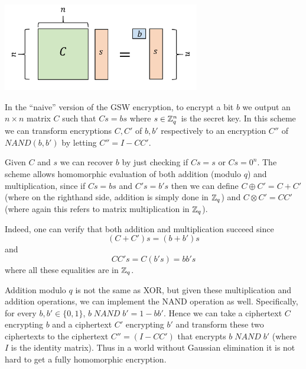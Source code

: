 \begin{marginfigure}
\centering
\includegraphics[width=\linewidth, height=1.5in, keepaspectratio]{../figure/naivegsw.png}
\caption{In the ``naive'' version of the GSW encryption, to encrypt a
bit \(b\) we output an \(n\times n\) matrix \(C\) such that \(Cs=bs\)
where \(s \in {\mathbb{Z}}_q^n\) is the secret key. In this scheme we can
transform encryptions \(C,C'\) of \(b,b'\) respectively to an encryption
\(C''\) of \(\ensuremath{\mathit{NAND}}(b,b')\) by letting
\(C'' = I-CC'\).}
\label{naivegswfig}
\end{marginfigure}

Given \(C\) and \(s\) we can recover \(b\) by just checking if \(Cs=s\)
or \(Cs=0^n\). The scheme allows homomorphic evaluation of both addition
(modulo \(q\)) and multiplication, since if \(Cs = bs\) and \(C's=b's\)
then we can define \(C \oplus C' = C + C'\) (where on the righthand
side, addition is simply done in \({\mathbb{Z}}_q\)) and
\(C\otimes C' = \ensuremath{\mathit{CC}}'\) (where again this refers to
matrix multiplication in \({\mathbb{Z}}_q\)).

Indeed, one can verify that both addition and multiplication succeed
since \[(C+C')s = (b+b')s\] and
\[\ensuremath{\mathit{CC}}'s = C(b's) = bb's\] where all these
equalities are in \({\mathbb{Z}}_q\).

Addition modulo \(q\) is not the same as XOR, but given these
multiplication and addition operations, we can implement the NAND
operation as well. Specifically, for every \(b,b' \in \{0,1\}\),
\(b \; \ensuremath{\mathit{NAND}} \; b' = 1-bb'\). Hence we can take a
ciphertext \(C\) encrypting \(b\) and a ciphertext \(C'\) encrypting
\(b'\) and transform these two ciphertexts to the ciphertext
\(C''=(I-CC')\) that encrypts \(b\; \ensuremath{\mathit{NAND}} \; b'\)
(where \(I\) is the identity matrix). Thus in a world without Gaussian
elimination it is not hard to get a fully homomorphic encryption.

\hypertarget{privkeyfhe}{}

